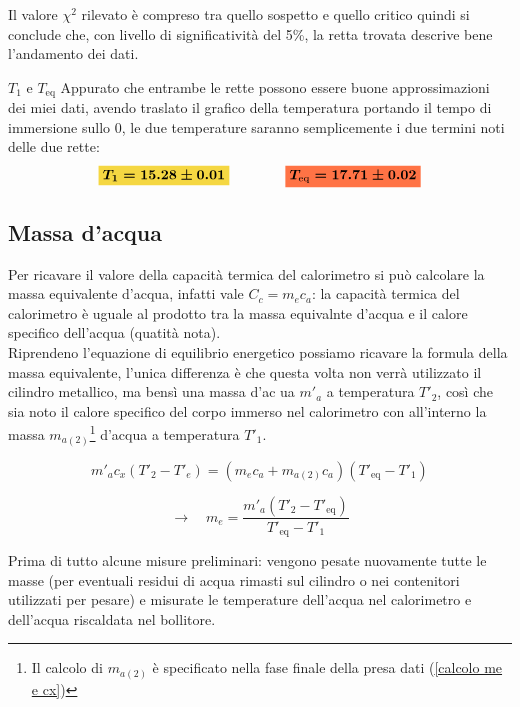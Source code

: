 \documentclass{article}
\newcommand{\giallo}[1]{\colorbox{myyellow}{$\displaystyle #1$}}
\newcommand{\rosso}[1]{\colorbox{myred}{$\displaystyle #1$}}
\begin{document}
	\noindent
	Il valore \(\chi^2\) rilevato è compreso tra quello sospetto e quello critico quindi si conclude che, con livello di significatività del 5\%, la retta trovata descrive bene l'andamento dei  dati.
	
	
	\begin{es}{\(T_{1}\) e \(T_{\text{eq}}\)}
		Appurato che entrambe le rette possono essere buone approssimazioni dei miei dati, avendo traslato il grafico della temperatura portando il tempo di immersione sullo 0, le due temperature saranno semplicemente i due termini noti delle due rette:
		\[ 
		\giallo{\boldsymbol{T_{1} = 15.28	\pm 0.01}}\qquad \qquad \rosso{\boldsymbol{T_{\text{eq}} = 17.71	\pm 0.02}}
		\]
	\end{es}
	
	
	
	\subsection{Massa d'acqua}
	Per ricavare il valore della capacità termica del calorimetro si può calcolare la massa equivalente d'acqua, infatti vale \(C_{c} = m_{e} c_{a}\): la capacità termica del calorimetro è uguale al prodotto tra la massa equivalnte d'acqua e il calore specifico dell'acqua (quatità nota). \\
	
	\noindent
	Riprendeno l'equazione di equilibrio energetico possiamo ricavare la formula della massa equivalente, l'unica differenza è che questa volta non verrà utilizzato il cilindro metallico, ma bensì una massa d'ac	ua \(m'_{a}\) a temperatura \(T'_{2}\), così che sia noto il calore specifico del corpo immerso nel calorimetro con all'interno la massa \(m_{a(2)}\)\footnote{Il calcolo di \(m_{a(2)}\) è specificato nella fase finale della presa dati (\ref{calcolo me e cx})} d'acqua a temperatura \(T'_{1}\).
	
	\[ 
	 m'_{a}c_{x}(T'_{2} - T'_{e}) = (m_{e}c_{a} + m_{a(2)}c_{a})(T'_{\text{eq}} - T'_{1})
	\] 
	
	\[ 
	\to \quad m_{e} = \frac{m'_{a}(T'_{2} - T'_{\text{eq}})}{T'_{\text{eq}}-T'_{1}}
	\]
	
	\noindent
	Prima di tutto alcune misure preliminari: vengono pesate nuovamente tutte le masse (per eventuali residui di acqua rimasti sul cilindro o nei contenitori utilizzati per pesare) e misurate le temperature dell'acqua nel calorimetro e dell'acqua riscaldata nel bollitore.
	
\end{document}
